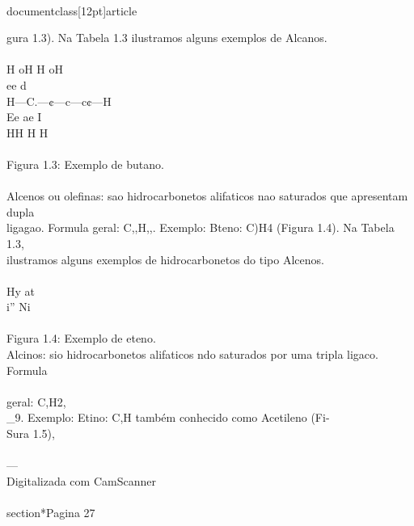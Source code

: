 \\documentclass[12pt]{article}
\begin{document}
{gura 1.3). Na Tabela 1.3 ilustramos alguns exemplos de Alcanos.\\
\\
H oH H oH\\
ee d\\
H—C.—¢—c—c¢—H\\
Ee ae I\\
HH H H\\
\\
Figura 1.3: Exemplo de butano.\\
\\
Alcenos ou olefinas: sao hidrocarbonetos alifaticos nao saturados que apresentam dupla\\
ligagao. Formula geral: C,,H,,. Exemplo: Bteno: C)H4 (Figura 1.4). Na Tabela 1.3,\\
ilustramos alguns exemplos de hidrocarbonetos do tipo Alcenos.\\
\\
Hy at\\
i” Ni\\
\\
Figura 1.4: Exemplo de eteno.\\
Alcinos: sio hidrocarbonetos alifaticos ndo saturados por uma tripla ligaco. Formula\\
\\
geral: C,H2,\\_9. Exemplo: Etino: C,H também conhecido como Acetileno (Fi-\\
Sura 1.5),\\
\\
—\\
Digitalizada com CamScanner\\

\\section*{Pagina 27}

}
\end{document}
